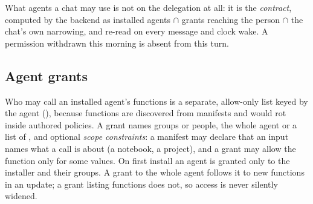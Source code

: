 What agents a chat may use is not on the delegation at all: it is the
\emph{contract}, computed by the backend as installed agents $\cap$
grants reaching the person $\cap$ the chat's own narrowing, and re-read
on every message and clock wake. A permission withdrawn this morning is
absent from this turn.

\subsection{Agent grants}

Who may call an installed agent's functions is a separate, allow-only
list keyed by the agent (), because functions are
discovered from manifests and would rot inside authored policies. A
grant names groups or people, the whole agent or a list of
, and optional \emph{scope constraints}: a manifest
may declare that an input names what a call is about (a notebook, a
project), and a grant may allow the function only for some values. On
first install an agent is granted only to the installer and their
groups. A grant to the whole agent follows it to new functions in an
update; a grant listing functions does not, so access is never silently
widened.
